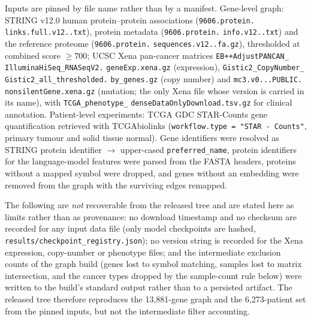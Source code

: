 \documentclass[11pt,a4paper]{article}
\begin{document}
\FloatBarrier



Inputs are pinned by file name rather than by a manifest. Gene-level graph: STRING v12.0 human protein--protein associations (\texttt{9606.\allowbreak protein.\allowbreak}\allowbreak
\allowbreak\texttt{links.\allowbreak full.\allowbreak v12..\allowbreak txt}), protein metadata (\texttt{9606.\allowbreak protein.\allowbreak}\allowbreak
\allowbreak\texttt{info.\allowbreak v12..\allowbreak txt}) and the reference proteome (\texttt{9606.\allowbreak protein.\allowbreak}\allowbreak
\allowbreak\texttt{sequences.\allowbreak v12..\allowbreak fa.\allowbreak gz}), thresholded at combined score $\geq 700$; UCSC Xena pan-cancer matrices \texttt{EB++AdjustPANCAN\_\allowbreak}\allowbreak
\allowbreak\texttt{IlluminaHiSeq\_\allowbreak RNASeqV2.\allowbreak}\allowbreak
\allowbreak\texttt{geneExp.\allowbreak xena.\allowbreak gz} (expression), \texttt{Gistic2\_\allowbreak CopyNumber\_\allowbreak}\allowbreak
\allowbreak\texttt{Gistic2\_\allowbreak all\_\allowbreak thresholded.\allowbreak}\allowbreak
\allowbreak\texttt{by\_\allowbreak genes.\allowbreak gz} (copy number) and \texttt{mc3.\allowbreak v0...\allowbreak PUBLIC.\allowbreak}\allowbreak
\allowbreak\texttt{nonsilentGene.\allowbreak xena.\allowbreak gz} (mutation; the only Xena file whose version is carried in its name), with \texttt{TCGA\_\allowbreak phenotype\_\allowbreak}
\allowbreak\texttt{denseDataOnlyDownload.\allowbreak tsv.\allowbreak gz} for clinical annotation. Patient-level experiments: TCGA GDC STAR-Counts gene quantification retrieved with TCGAbiolinks (\texttt{workflow.\allowbreak type = "STAR - Counts"}, primary tumour and solid tissue normal). Gene identifiers were resolved as STRING protein identifier $\rightarrow$ upper-cased \texttt{preferred\_\allowbreak name}, protein identifiers for the language-model features were parsed from the FASTA headers, proteins without a mapped symbol were dropped, and genes without an embedding were removed from the graph with the surviving edges remapped.

The following are \emph{not} recoverable from the released tree and are stated here as limits rather than as provenance: no download timestamp and no checksum are recorded for any input data file (only model checkpoints are hashed, \texttt{results/checkpoint\_\allowbreak registry.\allowbreak json}); no version string is recorded for the Xena expression, copy-number or phenotype files; and the intermediate exclusion counts of the graph build (genes lost to symbol matching, samples lost to matrix intersection, and the cancer types dropped by the sample-count rule below) were written to the build's standard output rather than to a persisted artifact. The released tree therefore reproduces the 13,881-gene graph and the 6,273-patient set from the pinned inputs, but not the intermediate filter accounting.
\end{document}
